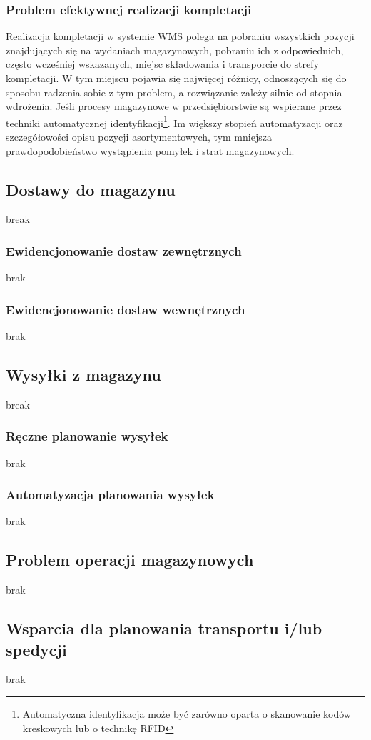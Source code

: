 		\subsubsection{Problem efektywnej realizacji kompletacji}
			Realizacja kompletacji w systemie WMS polega na pobraniu wszystkich pozycji znajdujących się na wydaniach
			magazynowych, pobraniu ich z odpowiednich, często wcześniej wskazanych, miejsc składowania i transporcie
			do strefy kompletacji. W tym miejscu pojawia się najwięcej różnicy, odnoszących się do sposobu radzenia
			sobie z tym problem, a rozwiązanie zależy silnie od stopnia wdrożenia. Jeśli procesy magazynowe
			w przedsiębiorstwie są wspierane przez techniki automatycznej identyfikacji\footnote{Automatyczna
			identyfikacja może być zarówno oparta o skanowanie kodów kreskowych lub o technikę RFID}. Im większy stopień
			automatyzacji oraz szczegółowości opisu pozycji asortymentowych, tym mniejsza prawdopodobieństwo 
			wystąpienia pomyłek i strat magazynowych.		
		
	\subsection{Dostawy do magazynu}
		break		
		\subsubsection{Ewidencjonowanie dostaw zewnętrznych}
			brak
		\subsubsection{Ewidencjonowanie dostaw wewnętrznych}
			brak
						
	\subsection{Wysyłki z magazynu}
		break
		\subsubsection{Ręczne planowanie wysyłek}
			brak		
		\subsubsection{Automatyzacja planowania wysyłek}
			brak
			
	\subsection{Problem operacji magazynowych}
		brak
	\subsection{Wsparcia dla planowania transportu i/lub spedycji}
		brak